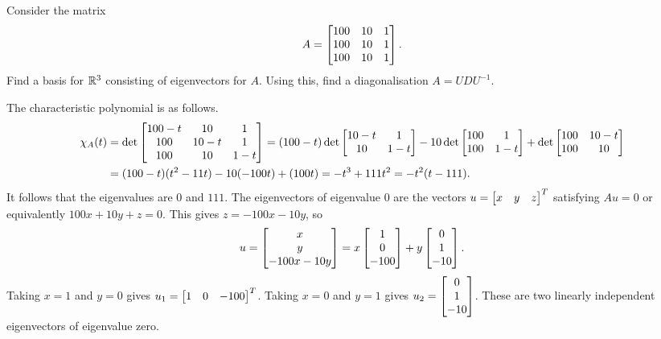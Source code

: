\documentclass[a4paper]{amsart}
\renewenvironment{solution}{\SolutionInline}{\endSolutionInline}
\begin{document}
\begin{exercise}\label{ex-diagonal-iii}
 Consider the matrix
 \[ A = \left[\begin{matrix} 100&10&1 \\ 100&10&1 \\ 100&10&1 \end{matrix}\right]. \]
 Find a basis for ${\mathbb{R}}^3$ consisting of eigenvectors for $A$.  Using
 this, find a diagonalisation $A=UDU^{-1}$.
\end{exercise}
\begin{solution}
 The characteristic polynomial is as follows.
 \begin{align*}
  \chi_A(t)
   &= \det\left[\begin{matrix} 100-t & 10 & 1 \\ 
               100 & 10-t & 1 \\
               100 & 10 & 1-t \end{matrix}\right] 
    = (100-t)\det\left[\begin{matrix} 10-t & 1 \\
                      10   & 1-t \end{matrix}\right] 
      -10    \det\left[\begin{matrix} 100  & 1 \\
                      100 & 1-t \end{matrix}\right] 
      +      \det\left[\begin{matrix} 100 & 10-t \\
                      100 & 10 \end{matrix}\right] \\
   &= (100-t)(t^2-11t) -10(-100t)+(100t) = -t^3+111t^2 = -t^2(t-111).
 \end{align*}
 It follows that the eigenvalues are $0$ and $111$.  The eigenvectors
 of eigenvalue $0$ are the vectors $u=\left[\begin{matrix} x&y&z\end{matrix}\right]^T$ satisfying
 $Au=0$ or equivalently $100x+10y+z=0$.  This gives $z=-100x-10y$, so 
 \[ u
      = \left[\begin{matrix} x\\y\\-100x-10y\end{matrix}\right] 
      = x \left[\begin{matrix} 1\\0\\-100 \end{matrix}\right] + y \left[\begin{matrix} 0\\1\\-10\end{matrix}\right].
 \]
 Taking $x=1$ and $y=0$ gives $u_1=\left[\begin{matrix} 1&0&-100\end{matrix}\right]^T$.  Taking $x=0$
 and $y=1$ gives $u_2=\left[\begin{matrix} 0\\1\\-10\end{matrix}\right]$.  These are two linearly
 independent eigenvectors of eigenvalue zero.  


\end{solution}
\end{document}
